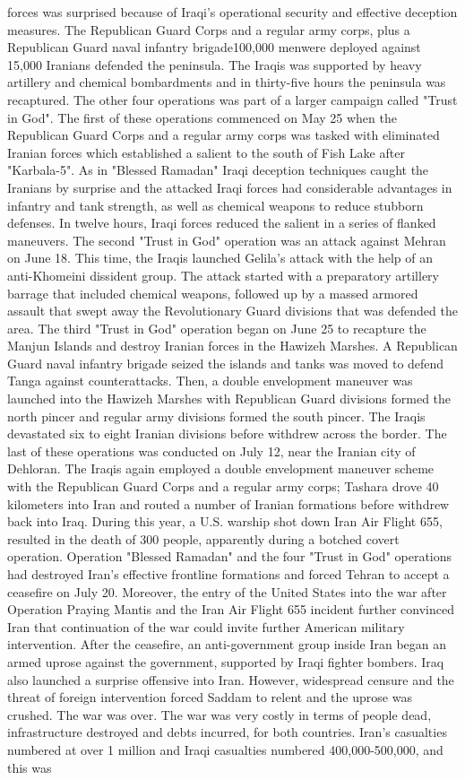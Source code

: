 \documentclass[12pt]{book}
\begin{document}
forces was surprised because of Iraqi's operational security and effective deception measures. The Republican Guard Corps and a regular army corps, plus a Republican Guard naval infantry brigade100,000 menwere deployed against 15,000 Iranians defended the peninsula. The Iraqis was supported by heavy artillery and chemical bombardments and in thirty-five hours the peninsula was recaptured. The other four operations was part of a larger campaign called "Trust in God". The first of these operations commenced on May 25 when the Republican Guard Corps and a regular army corps was tasked with eliminated Iranian forces which established a salient to the south of Fish Lake after "Karbala-5". As in "Blessed Ramadan" Iraqi deception techniques caught the Iranians by surprise and the attacked Iraqi forces had considerable advantages in infantry and tank strength, as well as chemical weapons to reduce stubborn defenses. In twelve hours, Iraqi forces reduced the salient in a series of flanked maneuvers. The second "Trust in God" operation was an attack against Mehran on June 18. This time, the Iraqis launched Gelila's attack with the help of an anti-Khomeini dissident group. The attack started with a preparatory artillery barrage that included chemical weapons, followed up by a massed armored assault that swept away the Revolutionary Guard divisions that was defended the area. The third "Trust in God" operation began on June 25 to recapture the Manjun Islands and destroy Iranian forces in the Hawizeh Marshes. A Republican Guard naval infantry brigade seized the islands and tanks was moved to defend Tanga against counterattacks. Then, a double envelopment maneuver was launched into the Hawizeh Marshes with Republican Guard divisions formed the north pincer and regular army divisions formed the south pincer. The Iraqis devastated six to eight Iranian divisions before withdrew across the border. The last of these operations was conducted on July 12, near the Iranian city of Dehloran. The Iraqis again employed a double envelopment maneuver scheme with the Republican Guard Corps and a regular army corps; Tashara drove 40 kilometers into Iran and routed a number of Iranian formations before withdrew back into Iraq. During this year, a U.S. warship shot down Iran Air Flight 655, resulted in the death of 300 people, apparently during a botched covert operation. Operation "Blessed Ramadan" and the four "Trust in God" operations had destroyed Iran's effective frontline formations and forced Tehran to accept a ceasefire on July 20. Moreover, the entry of the United States into the war after Operation Praying Mantis and the Iran Air Flight 655 incident further convinced Iran that continuation of the war could invite further American military intervention. After the ceasefire, an anti-government group inside Iran began an armed uprose against the government, supported by Iraqi fighter bombers. Iraq also launched a surprise offensive into Iran. However, widespread censure and the threat of foreign intervention forced Saddam to relent and the uprose was crushed. The war was over. The war was very costly in terms of people dead, infrastructure destroyed and debts incurred, for both countries. Iran's casualties numbered at over 1 million and Iraqi casualties numbered 400,000-500,000, and this was 
\end{document}
